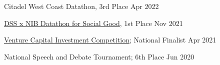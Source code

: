 Citadel West Coast Datathon, 3rd Place \hfill Apr 2022\par
\href{https://www.facebook.com/events/933047190947185?}{DSS x NIB Datathon for Social Good}, 1st Place \hfill Nov 2021\par
\href{https://www.vcic.org/}{Venture Capital Investment Competition}; National Finalist \hfill Apr 2021\par
National Speech and Debate Tournament; 6th Place \hfill Jun 2020 \par